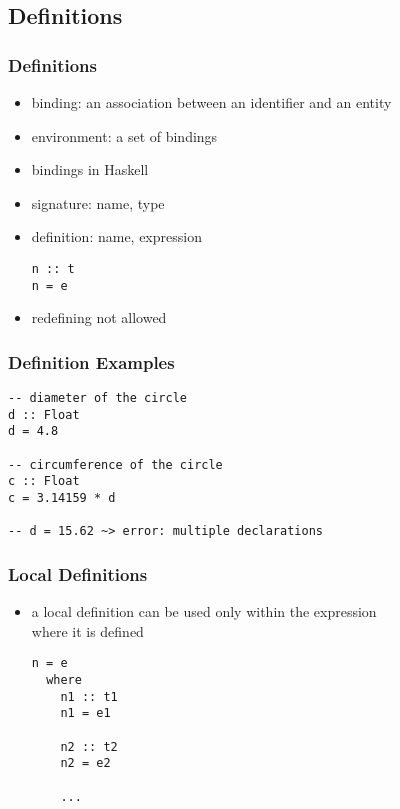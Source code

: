 \documentclass[dvipsnames]{beamer}
\theoremstyle{plain}
\begin{document}
\subsection{Definitions}

\begin{frame}[fragile]
  \frametitle{Definitions}

  \begin{itemize}
    \item \alert{binding}: an association between an identifier and an entity
    \item \alert{environment}: a set of bindings

    \pause
    \bigskip
    \item bindings in Haskell
    \item signature: name, type
    \item definition: name, expression
    \begin{lstlisting}[style=syntax]
n :: t
n = e
    \end{lstlisting}

    \medskip
    \item redefining not allowed
  \end{itemize}
\end{frame}

\begin{frame}[fragile]
  \frametitle{Definition Examples}

  \begin{lstlisting}
-- diameter of the circle
d :: Float
d = 4.8

-- circumference of the circle
c :: Float
c = 3.14159 * d

-- d = 15.62 ~> error: multiple declarations
  \end{lstlisting}
\end{frame}

\begin{frame}[fragile]
  \frametitle{Local Definitions}

  \begin{itemize}
    \item a local definition can be used only within the expression\\
      where it is defined
    \begin{lstlisting}[style=syntax]
n = e
  where
    n1 :: t1
    n1 = e1

    n2 :: t2
    n2 = e2

    ...
    \end{lstlisting}
  \end{itemize}
\end{frame}
\end{document}
